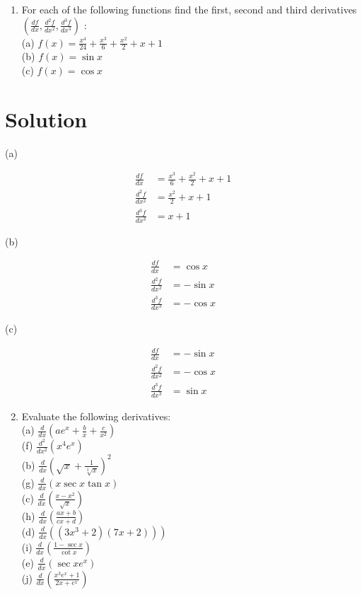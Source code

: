 \documentclass[10pt]{article}
\begin{document}
\begin{enumerate}
  \item For each of the following functions find the first, second and third derivatives $\left(\frac{d f}{d x}, \frac{d^{2} f}{d x^{2}}, \frac{d^{3} f}{d x^{3}}\right)$ :\\
(a) $f(x)=\frac{x^{4}}{24}+\frac{x^{3}}{6}+\frac{x^{2}}{2}+x+1$\\
(b) $f(x)=\sin x$\\
(c) $f(x)=\cos x$
\end{enumerate}

\section*{Solution}
(a)


\begin{align*}
\frac{d f}{d x} & =\frac{x^{3}}{6}+\frac{x^{2}}{2}+x+1  \tag{1}\\
\frac{d^{2} f}{d x^{2}} & =\frac{x^{2}}{2}+x+1  \tag{2}\\
\frac{d^{3} f}{d x^{3}} & =x+1 \tag{3}
\end{align*}


(b)


\begin{align*}
\frac{d f}{d x} & =\cos x  \tag{4}\\
\frac{d^{2} f}{d x^{2}} & =-\sin x  \tag{5}\\
\frac{d^{3} f}{d x^{3}} & =-\cos x \tag{6}
\end{align*}


(c)


\begin{align*}
\frac{d f}{d x} & =-\sin x  \tag{7}\\
\frac{d^{2} f}{d x^{2}} & =-\cos x  \tag{8}\\
\frac{d^{3} f}{d x^{3}} & =\sin x \tag{9}
\end{align*}


\begin{enumerate}
  \setcounter{enumi}{1}
  \item Evaluate the following derivatives:\\
(a) $\frac{d}{d x}\left(a e^{x}+\frac{b}{x}+\frac{c}{x^{2}}\right)$\\
(f) $\frac{d^{2}}{d x^{2}}\left(x^{4} e^{x}\right)$\\
(b) $\frac{d}{d x}\left(\sqrt{x}+\frac{1}{\sqrt[3]{x}}\right)^{2}$\\
(g) $\frac{d}{d x}(x \sec x \tan x)$\\
(c) $\frac{d}{d x}\left(\frac{x-x^{2}}{\sqrt{x}}\right)$\\
(h) $\frac{d}{d x}\left(\frac{a x+b}{c x+d}\right)$\\
(d) $\left.\frac{d}{d x}\left(\left(3 x^{3}+2\right)(7 x+2)\right)\right)$\\
(i) $\frac{d}{d x}\left(\frac{1-\sec x}{\cot x}\right)$\\
(e) $\frac{d}{d x}\left(\sec x e^{x}\right)$\\
(j) $\frac{d}{d x}\left(\frac{x^{3} e^{x}+1}{2 x+e^{x}}\right)$
\end{enumerate}
\end{document}
